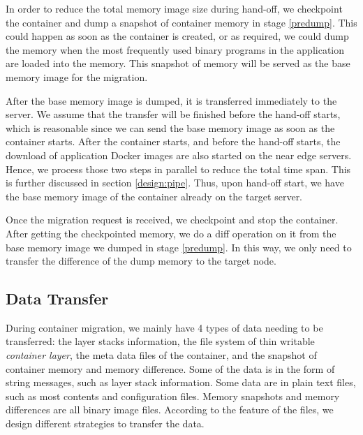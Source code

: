 In order to reduce the total memory image size during hand-off, we checkpoint the container and dump a snapshot of container memory in stage \ref{predump}. This could happen as soon as the container is created, or as required, we could dump the memory when the most frequently used binary programs in the application are loaded into the memory. This snapshot of memory will be served as the base memory image for the migration.

After the base memory image is dumped, it is transferred immediately to the server. We assume that the transfer will be finished before the hand-off starts, which is reasonable since we can send the base memory image as soon as the container starts. 
After the container starts, and before the hand-off starts, the download of application Docker images are also started on the near edge servers. 
Hence, we process those two steps in parallel to reduce the total time span. This is further discussed in section \ref{design:pipe}. Thus, upon hand-off start, we have the base memory image of the container already on the target server. 

Once the migration request is received, we checkpoint and stop the container. After getting the checkpointed memory, we do a diff operation on it from the base memory image we dumped in stage \ref{predump}. 
In this way, we only need to transfer the difference of the dump memory to the target node. 

\subsection{Data Transfer}\label{design:compression}

During container migration, we mainly have 4 types of data needing to be transferred:
the layer stacks information, the file system of thin writable \textit{container layer}, the meta data files of the container, and the snapshot of container memory and memory difference. Some of the data is in the form of string messages, such as layer stack information. Some data are in plain text files, such as most contents and configuration files. Memory snapshots and memory differences are all binary image files. According to the feature of the files, we design different strategies to transfer the data.

